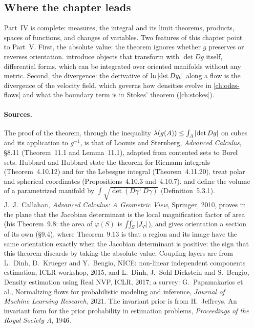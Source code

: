 \begin{notechapter}
\section{Where the chapter leads}\label{change-of-variables:sec:outlook}

Part~IV is complete: measures, the integral and its limit theorems,
products, spaces of functions, and changes of variables. Two features of
this chapter point to Part~V. First, the absolute value: the theorem
ignores whether $g$ preserves or reverses orientation.
 introduce objects
that transform with $\det Dg$ itself, differential forms, which can be
integrated over oriented manifolds without any metric. Second, the
divergence: the derivative of $\ln\left|\det Dg_t\right|$ along a flow is the
divergence of the velocity field, which governs how densities evolve
in \cref{ch:odes-flows} and what the boundary term is in Stokes'
theorem (\cref{ch:stokes}).

\paragraph{Sources.} The proof of the theorem, through the inequality
$\lambda(g(A))\leq\int_A\left|\det Dg\right|$ on cubes and its application to
$g^{-1}$, is that of Loomis and Sternberg, \emph{Advanced Calculus},
\S8.11 (Theorem~11.1 and Lemma~11.1), adapted from contented sets to
Borel sets. Hubbard and Hubbard state the theorem for Riemann integrals
(Theorem~4.10.12) and for the Lebesgue integral (Theorem~4.11.20), treat
polar and spherical coordinates (Propositions~4.10.3 and~4.10.7), and
define the volume of a parametrized manifold by
$\int\sqrt{\det(D\gamma^\top D\gamma)}$ (Definition~5.3.1).
J.~J.~Callahan, \emph{Advanced Calculus: A Geometric View}, Springer,
2010, proves in the plane that the Jacobian determinant is the local
magnification factor of area (his Theorem~9.8: the area of
$\varphi(S)$ is $\iint_S\left|J_\varphi\right|$), and gives orientation a
section of its own (\S9.4), where Theorem~9.13 is that a region and its
image have the same orientation exactly when the Jacobian determinant
is positive: the sign that this theorem discards by taking the absolute
value. Coupling
layers are from L.~Dinh, D.~Krueger and Y.~Bengio, NICE: non-linear
independent components estimation, ICLR workshop, 2015, and
L.~Dinh, J.~Sohl-Dickstein
and S.~Bengio, Density estimation using Real NVP, ICLR, 2017; a survey:
G.~Papamakarios et al., Normalizing flows for probabilistic modeling
and inference, \emph{Journal of Machine Learning Research}, 2021. The
invariant prior is from H.~Jeffreys, An invariant form for the prior
probability in estimation problems, \emph{Proceedings of the Royal
Society A}, 1946.


\end{notechapter}

